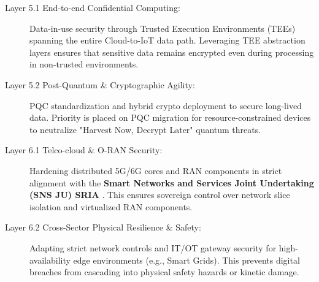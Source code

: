 \documentclass[12pt,a4paper]{article}
\begin{document}
\begin{description}
\item[Layer 5.1 End-to-end Confidential Computing:] Data-in-use security through Trusted Execution Environments (TEEs) spanning the entire Cloud-to-IoT data path. Leveraging TEE abstraction layers ensures that sensitive data remains encrypted even during processing in non-trusted environments.

\item[Layer 5.2 Post-Quantum \& Cryptographic Agility:] PQC standardization and hybrid crypto deployment to secure long-lived data. Priority is placed on PQC migration for resource-constrained devices to neutralize "Harvest Now, Decrypt Later" quantum threats.

\item[Layer 6.1 Telco-cloud \& O-RAN Security:] Hardening distributed 5G/6G cores and RAN components in strict alignment with the \textbf{Smart Networks and Services Joint Undertaking (SNS JU) SRIA} \cite{snsju}. This ensures sovereign control over network slice isolation and virtualized RAN components.

\item[Layer 6.2 Cross-Sector Physical Resilience \& Safety:] Adapting strict network controls and IT/OT gateway security for high-availability edge environments (e.g., Smart Grids). This prevents digital breaches from cascading into physical safety hazards or kinetic damage.

\end{description}
\end{document}

